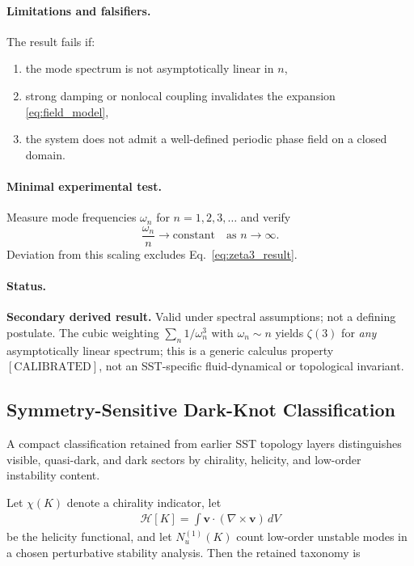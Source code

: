 \documentclass[11pt]{article}
\theoremstyle{definition}
\theoremstyle{plain}
\theoremstyle{remark}
\begin{document}
    \paragraph{Limitations and falsifiers.}
        The result fails if:
        \begin{enumerate}
            \item the mode spectrum is not asymptotically linear in $n$,
            \item strong damping or nonlocal coupling invalidates the expansion \eqref{eq:field_model},
            \item the system does not admit a well-defined periodic phase field on a closed domain.
        \end{enumerate}

    \paragraph{Minimal experimental test.}
        Measure mode frequencies $\omega_n$ for $n=1,2,3,\dots$ and verify
        \begin{equation}
            \frac{\omega_n}{n} \to \text{constant}
            \quad\text{as } n\to\infty.
        \end{equation}
        Deviation from this scaling excludes Eq.~\eqref{eq:zeta3_result}.

    \paragraph{Status.}
        \textbf{Secondary derived result.} Valid under spectral assumptions; not a defining postulate. The cubic weighting $\sum_n 1/\omega_n^3$ with $\omega_n\sim n$ yields $\zeta(3)$ for \emph{any} asymptotically linear spectrum; this is a generic calculus property $[\text{CALIBRATED}]$, not an SST-specific fluid-dynamical or topological invariant.

\subsection{Symmetry-Sensitive Dark-Knot Classification}
    \label{subsec:dark_knot_classification}

    A compact classification retained from earlier SST topology layers distinguishes visible, quasi-dark, and dark sectors by chirality, helicity, and low-order instability content.

    Let $\chi(K)$ denote a chirality indicator, let
    \begin{align}
        \mathcal{H}[K] = \int \mathbf{v}\cdot(\nabla\times\mathbf{v})\,dV
    \end{align}
    be the helicity functional, and let $N_u^{(1)}(K)$ count low-order unstable modes in a chosen perturbative stability analysis. Then the retained taxonomy is
\end{document}
